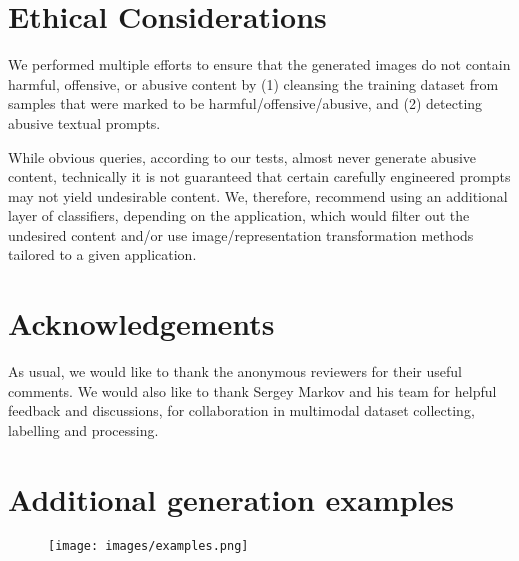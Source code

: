 \documentclass[11pt]{article}
\begin{document}
\section{Ethical Considerations}

We performed multiple efforts to ensure that the generated images do not contain harmful, offensive, or abusive content by (1) cleansing the training dataset from samples that were marked to be harmful/offensive/abusive, and (2) detecting abusive textual prompts. 

While obvious queries, according to our tests, almost never generate abusive content, technically it is not guaranteed that certain carefully engineered prompts may not yield undesirable content. We, therefore, recommend using an additional layer of classifiers, depending on the application, which would filter out the undesired content and/or use image/representation transformation methods tailored to a given application.

\section*{Acknowledgements}
As usual, we would like to thank the anonymous reviewers
for their useful comments. We would also like to
thank Sergey Markov and his team for helpful feedback and discussions, for collaboration in multimodal dataset collecting, labelling and processing.





\clearpage
\appendix

\section{Additional generation examples}

\begin{figure}[htp!]
  \centering
  \texttt{[image: images/examples.png]}
  \label{examples}
\end{figure}
\end{document}
